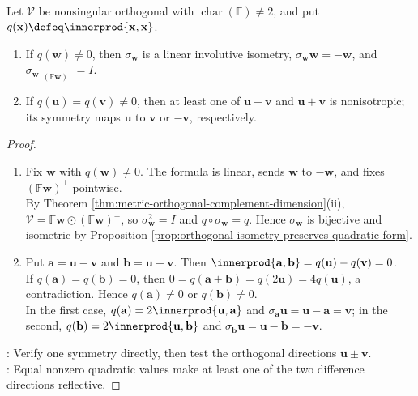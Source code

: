\begin{proposition} \label{prop:symmetry-matches-equal-length-nonisotropic-vectors} \\
Let $\mathcal{V}$ be nonsingular orthogonal with $\operatorname{char}(\mathbb{F})\neq2$, and put $q(\mathbf{x})\defeq\innerprod{\mathbf{x},\mathbf{x}}$.
\begin{enumerate}[label=(\roman*)]
\setlength{\itemsep}{0pt}
\item If $q(\mathbf{w})\neq0$, then $\sigma_{\mathbf{w}}$ is a linear involutive isometry, $\sigma_{\mathbf{w}}\mathbf{w}=-\mathbf{w}$, and $\sigma_{\mathbf{w}}|_{(\mathbb{F}\mathbf{w})^{\perp}}=I$.
\item If $q(\mathbf{u})=q(\mathbf{v})\neq0$, then at least one of $\mathbf{u}-\mathbf{v}$ and $\mathbf{u}+\mathbf{v}$ is nonisotropic; its symmetry maps $\mathbf{u}$ to $\mathbf{v}$ or $-\mathbf{v}$, respectively.
\end{enumerate}
\begin{proof}
\begin{enumerate}[label=(\roman*)]
\setlength{\itemsep}{0pt}
\item Fix $\mathbf{w}$ with $q(\mathbf{w})\neq0$. The formula is linear, sends $\mathbf{w}$ to $-\mathbf{w}$, and fixes $(\mathbb{F}\mathbf{w})^{\perp}$ pointwise.\\
By Theorem \ref{thm:metric-orthogonal-complement-dimension}(ii), $\mathcal{V}=\mathbb{F}\mathbf{w}\odot(\mathbb{F}\mathbf{w})^{\perp}$, so $\sigma_{\mathbf{w}}^2=I$ and $q\circ\sigma_{\mathbf{w}}=q$. Hence $\sigma_{\mathbf{w}}$ is bijective and isometric by Proposition \ref{prop:orthogonal-isometry-preserves-quadratic-form}.
\item Put $\mathbf{a}=\mathbf{u}-\mathbf{v}$ and $\mathbf{b}=\mathbf{u}+\mathbf{v}$. Then $\innerprod{\mathbf{a},\mathbf{b}}=q(\mathbf{u})-q(\mathbf{v})=0$.\\
If $q(\mathbf{a})=q(\mathbf{b})=0$, then $0=q(\mathbf{a}+\mathbf{b})=q(2\mathbf{u})=4q(\mathbf{u})$, a contradiction. Hence $q(\mathbf{a})\neq0$ or $q(\mathbf{b})\neq0$.\\
In the first case, $q(\mathbf{a})=2\innerprod{\mathbf{u},\mathbf{a}}$ and $\sigma_{\mathbf{a}}\mathbf{u}=\mathbf{u}-\mathbf{a}=\mathbf{v}$; in the second, $q(\mathbf{b})=2\innerprod{\mathbf{u},\mathbf{b}}$ and $\sigma_{\mathbf{b}}\mathbf{u}=\mathbf{u}-\mathbf{b}=-\mathbf{v}$.
\end{enumerate}
: Verify one symmetry directly, then test the orthogonal directions $\mathbf{u}\pm\mathbf{v}$.\\
: Equal nonzero quadratic values make at least one of the two difference directions reflective.
\end{proof}
\end{proposition}

